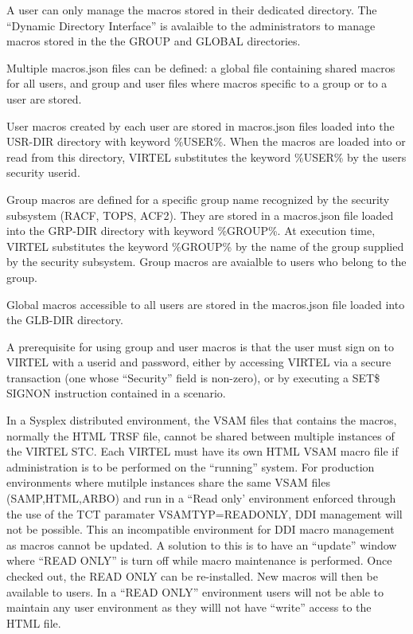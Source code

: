 \documentclass[letterpaper,10pt,english]{sphinxmanual}
\begin{document}
A user can only manage the macros stored in their dedicated directory. The “Dynamic Directory Interface” is avalaible to the administrators to manage macros stored in the the GROUP and GLOBAL directories.

Multiple macros.json files can be defined: a global file containing shared macros for all users, and group and user files where macros specific to a group or to a user are stored.

User macros created by each user are stored in macros.json files loaded into the USR-DIR directory with keyword \%USER\%. When the macros are loaded into or read from this directory, VIRTEL substitutes the keyword \%USER\% by the users security userid.

Group macros are defined for a specific group name recognized by the security subsystem (RACF, TOPS, ACF2). They are stored in a macros.json file loaded into the GRP-DIR directory with keyword \%GROUP\%. At execution time, VIRTEL substitutes the keyword \%GROUP\% by the name of the group supplied by the security subsystem. Group macros are avaialble to users who belong to the group.

Global macros accessible to all users are stored in the macros.json file loaded into the GLB-DIR directory.

A prerequisite for using group and user macros is that the user must sign on to VIRTEL with a userid and password, either by accessing VIRTEL via a secure transaction (one whose “Security” field is non-zero), or by executing a SET\$ SIGNON instruction contained in a scenario.

In a Sysplex distributed environment, the VSAM files that contains the macros, normally the HTML TRSF file, cannot be shared between multiple instances of the VIRTEL STC. Each VIRTEL must have its own HTML VSAM macro file if administration is to be performed on the “running” system. For production environments where mutilple instances share the same VSAM files (SAMP,HTML,ARBO) and run in a “Read only’ environment enforced through the use of the TCT paramater VSAMTYP=READONLY, DDI management will not be possible. This an incompatible environment for DDI macro management as macros cannot be updated. A solution to this is to have an “update” window where “READ ONLY” is turn off while macro maintenance is performed. Once checked out, the READ ONLY can be re-installed. New macros will then be available to users. In a “READ ONLY” environment users will not be able to maintain any user environment as they willl not have “write” access to the HTML file.
\end{document}

